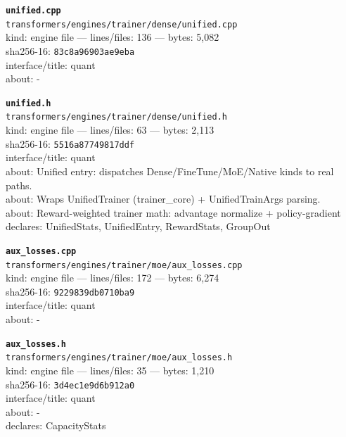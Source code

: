 \noindent\textbf{\texttt{unified.cpp}}\\
\texttt{transformers/engines/trainer/dense/unified.cpp}\\
kind: engine file --- lines/files: 136 --- bytes: 5,082\\
sha256-16: \texttt{83c8a96903ae9eba}\\
interface/title: quant\\
about: -\\
\vspace*{6.0pt}

\noindent\textbf{\texttt{unified.h}}\\
\texttt{transformers/engines/trainer/dense/unified.h}\\
kind: engine file --- lines/files: 63 --- bytes: 2,113\\
sha256-16: \texttt{5516a87749817ddf}\\
interface/title: quant\\
about: Unified entry: dispatches Dense/FineTune/MoE/Native kinds to real paths.\\
about: Wraps UnifiedTrainer (trainer\_core) + UnifiedTrainArgs parsing.\\
about: Reward-weighted trainer math: advantage normalize + policy-gradient\\
declares: UnifiedStats, UnifiedEntry, RewardStats, GroupOut\\
\vspace*{6.0pt}
\newpage

\noindent\textbf{\texttt{aux\_losses.cpp}}\\
\texttt{transformers/engines/trainer/moe/aux\_losses.cpp}\\
kind: engine file --- lines/files: 172 --- bytes: 6,274\\
sha256-16: \texttt{9229839db0710ba9}\\
interface/title: quant\\
about: -\\
\vspace*{6.0pt}

\noindent\textbf{\texttt{aux\_losses.h}}\\
\texttt{transformers/engines/trainer/moe/aux\_losses.h}\\
kind: engine file --- lines/files: 35 --- bytes: 1,210\\
sha256-16: \texttt{3d4ec1e9d6b912a0}\\
interface/title: quant\\
about: -\\
declares: CapacityStats\\
\vspace*{6.0pt}

